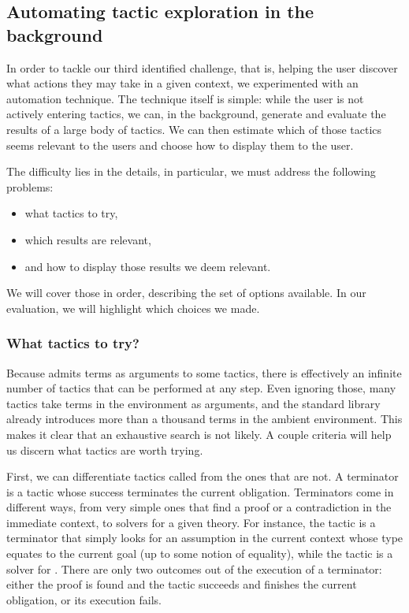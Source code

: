 \subsection{Automating tactic exploration in the
background}\label{peacoq-design-automation}

In order to tackle our third identified challenge, that is, helping the user
discover what actions they may take in a given context, we experimented with an
automation technique.  The technique itself is simple: while the user is not
actively entering tactics, we can, in the background, generate and evaluate the
results of a large body of tactics.  We can then estimate which of those tactics
seems relevant to the users and choose how to display them to the user.

The difficulty lies in the details, in particular, we must address the following
problems:

\begin{itemize}

  \item what tactics to try,

  \item which results are relevant,

  \item and how to display those results we deem relevant.

\end{itemize}

We will cover those in order, describing the set of options available.  In our
evaluation, we will highlight which choices we made.

\subsubsection{What tactics to try?}

Because \Coq{} admits \Gallina{} terms as arguments to some \Ltac{} tactics,
there is effectively an infinite number of tactics that can be performed at any
step.  Even ignoring those, many tactics take terms in the environment as
arguments, and the standard library already introduces more than a thousand
terms in the ambient environment.  This makes it clear that an exhaustive search
is not likely.  A couple criteria will help us discern what tactics are worth trying.

First, we can differentiate tactics called  from the ones
that are not.  A terminator is a tactic whose success terminates the current
obligation.  Terminators come in different ways, from very simple ones that find
a proof or a contradiction in the immediate context, to solvers for a given
theory.  For instance, the  tactic is a terminator that
simply looks for an assumption in the current context whose type equates to the
current goal (up to some notion of equality), while the  tactic
is a  solver for .  There are
only two outcomes out of the execution of a terminator: either the proof is
found and the tactic succeeds and finishes the current obligation, or its
execution fails.

